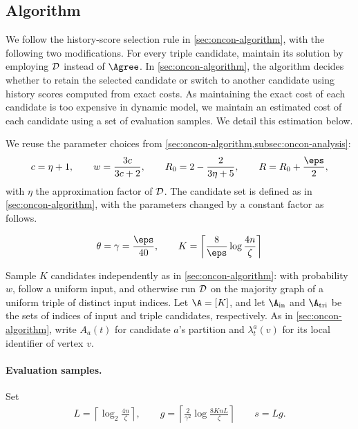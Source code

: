 \subsection{Algorithm}\label{subsec:explicit.consensus.algorithm}

We follow the history-score selection rule in \cref{sec:oncon-algorithm}, with the following two modifications.
For every triple candidate, maintain its solution by employing $ \mathcal D $ instead of $ \Agree $.
In \cref{sec:oncon-algorithm}, the algorithm decides whether to retain the selected candidate or switch to another candidate using history scores computed from exact costs.
As maintaining the exact cost of each candidate is too expensive in dynamic model, we maintain an estimated cost of each candidate using a set of evaluation samples. 
We detail this estimation below.

We reuse the parameter choices from \cref{sec:oncon-algorithm,subsec:oncon-analysis}:
\begin{equation*}
  c=\eta+1,\qquad
  w=\frac{3c}{3c+2},\qquad
  R_0=2-\frac{2}{3\eta+5},\qquad
  R=R_0+\frac{\eps}{2},
\end{equation*}
with $ \eta $ the approximation factor of $ \mathcal D $. 
The candidate set is defined as in \cref{sec:oncon-algorithm}, with the parameters changed by a constant factor as follows.

\begin{align}
    \theta=\gamma=\frac{\eps}{40}, \qquad
    K=\left\lceil\frac{8}{\eps}\log\frac{4n}{\zeta}\right\rceil \label{eq:explicit.dynamic.consensus.K}
\end{align}

Sample $ K $ candidates independently as in \cref{sec:oncon-algorithm}: with probability $ w $, follow a uniform input, and otherwise run $ \mathcal D $ on the majority graph of a uniform triple of distinct input indices.
Let $ \A=[K] $, and let $ \A_{\rm in} $ and $ \A_{\rm tri} $ be the sets of indices of input and triple candidates, respectively. As in \cref{sec:oncon-algorithm}, write $ A_a(t) $ for candidate $ a $'s partition and $ \lambda_t^a(v) $ for its local identifier of vertex $ v $.

\paragraph{Evaluation samples.}
Set
\begin{align}
    L=\left\lceil\log_2\frac{4n}{\zeta}\right\rceil, \qquad
    g=\left\lceil\frac{2}{\gamma^2}\log\frac{8KnL}{\zeta}\right\rceil \qquad
    s=Lg.
    \label{eq:explicit.consensus.parameters}
\end{align}

